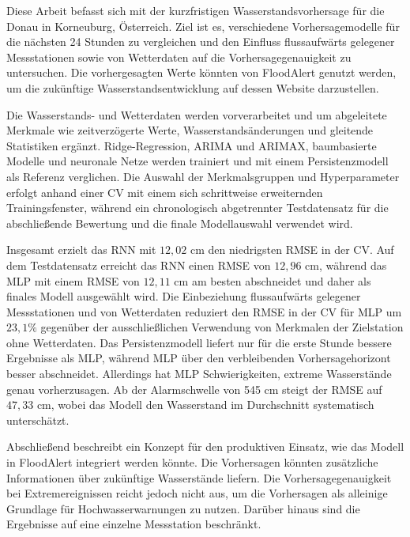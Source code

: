 Diese Arbeit befasst sich mit der kurzfristigen Wasserstandsvorhersage für die Donau in Korneuburg, Österreich. Ziel ist es, verschiedene Vorhersagemodelle für die nächsten 24 Stunden zu vergleichen und den Einfluss flussaufwärts gelegener Messstationen sowie von Wetterdaten auf die Vorhersagegenauigkeit zu untersuchen. Die vorhergesagten Werte könnten von FloodAlert genutzt werden, um die zukünftige Wasserstandsentwicklung auf dessen Website darzustellen.

Die Wasserstands- und Wetterdaten werden vorverarbeitet und um abgeleitete Merkmale wie zeitverzögerte Werte, Wasserstandsänderungen und gleitende Statistiken ergänzt. Ridge-Regression, \ac{ARIMA} und \ac{ARIMAX}, baumbasierte Modelle und neuronale Netze werden trainiert und mit einem Persistenzmodell als Referenz verglichen. Die Auswahl der Merkmalsgruppen und Hyperparameter erfolgt anhand einer \ac{CV} mit einem sich schrittweise erweiternden Trainingsfenster, während ein chronologisch abgetrennter Testdatensatz für die abschließende Bewertung und die finale Modellauswahl verwendet wird.

Insgesamt erzielt das \ac{RNN} mit $12{,}02$ cm den niedrigsten \ac{RMSE} in der \ac{CV}. Auf dem Testdatensatz erreicht das \ac{RNN} einen \ac{RMSE} von $12{,}96$ cm, während das \ac{MLP} mit einem \ac{RMSE} von $12{,}11$ cm am besten abschneidet und daher als finales Modell ausgewählt wird. Die Einbeziehung flussaufwärts gelegener Messstationen und von Wetterdaten reduziert den \ac{RMSE} in der \ac{CV} für \ac{MLP} um $23{,}1\%$ gegenüber der ausschließlichen Verwendung von Merkmalen der Zielstation ohne Wetterdaten. Das Persistenzmodell liefert nur für die erste Stunde bessere Ergebnisse als \ac{MLP}, während \ac{MLP} über den verbleibenden Vorhersagehorizont besser abschneidet. Allerdings hat \ac{MLP} Schwierigkeiten, extreme Wasserstände genau vorherzusagen. Ab der Alarmschwelle von 545 cm steigt der \ac{RMSE} auf $47{,}33$ cm, wobei das Modell den Wasserstand im Durchschnitt systematisch unterschätzt.

Abschließend beschreibt ein Konzept für den produktiven Einsatz, wie das Modell in FloodAlert integriert werden könnte. Die Vorhersagen könnten zusätzliche Informationen über zukünftige Wasserstände liefern. Die Vorhersagegenauigkeit bei Extremereignissen reicht jedoch nicht aus, um die Vorhersagen als alleinige Grundlage für Hochwasserwarnungen zu nutzen. Darüber hinaus sind die Ergebnisse auf eine einzelne Messstation beschränkt.
